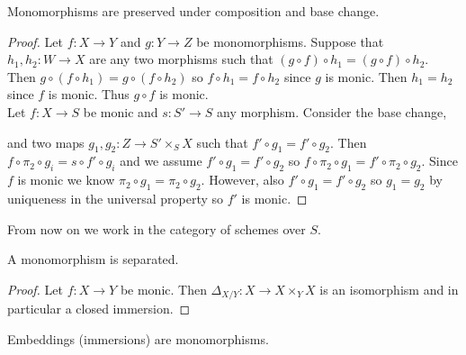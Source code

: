 \documentclass[12pt]{article}
\begin{document}
\begin{lemma}
Monomorphisms are preserved under composition and base change.
\end{lemma}

\begin{proof}
Let $f : X \to Y$ and $g : Y \to Z$ be monomorphisms. Suppose that $h_1, h_2 : W \to X$ are any two morphisms such that $(g \circ f) \circ h_1 = (g \circ f) \circ h_2$. Then $g \circ (f \circ h_1) = g \circ (f \circ h_2)$ so $f \circ h_1 = f \circ h_2$ since $g$ is monic. Then $h_1 = h_2$ since $f$ is monic. Thus $g \circ f$ is monic.
\bigskip\\
Let $f : X \to S$ be monic and $s : S' \to S$ any morphism. Consider the base change,
\begin{center}
\end{center}
and two maps $g_1, g_2 : Z \to S' \times_S X$ such that $f' \circ g_1 = f' \circ g_2$. Then $f \circ \pi_2 \circ g_i = s \circ f' \circ g_i$ and we assume $f' \circ g_1 = f' \circ g_2$ so $f \circ \pi_2 \circ g_1 = f' \circ \pi_2 \circ g_2$. Since $f$ is monic we know $\pi_2 \circ g_1 = \pi_2 \circ g_2$. However, also $f' \circ g_1 = f' \circ g_2$ so $g_1 = g_2$ by uniqueness in the universal property so $f'$ is monic.
\end{proof}

\begin{rmk}
From now on we work in the category of schemes over $S$.
\end{rmk}

\begin{lemma}
A monomorphism is separated.
\end{lemma}

\begin{proof}
Let $f : X \to Y$ be monic. Then $\Delta_{X/Y} : X \to X \times_Y X$ is an isomorphism and in particular a closed immersion.
\end{proof}

\begin{lemma}
Embeddings (immersions) are monomorphisms.
\end{lemma}
\end{document}
